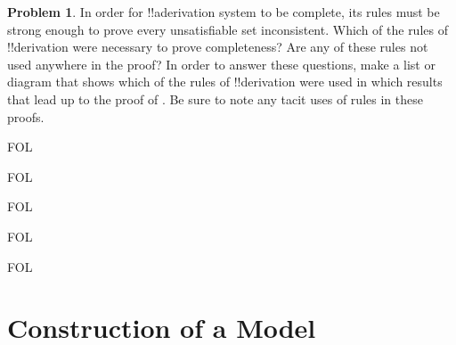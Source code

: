 \documentclass[10pt,a4paper]{article}
\makeatletter
\theoremstyle{plain}
\theoremstyle{definition}
\newtheorem{prob}{Problem}[section]
\theoremstyle{remark}
\newcommand*{\olfileid}[3]{}
\newcommand*{\olsection}[1]{\section*{#1}}
\newcommand*{\olchapter}[3]{}
\newcommand*{\olimport}[1]{}
\newcommand{\olref}{\@ifnextchar[{\olref@i}{\olref@final}}
\def\olref@i[#1]{\@ifnextchar[{\olref@ii}{\olref@final}}
\def\olref@ii[#1]{\@ifnextchar[{\olref@iii}{\olref@final}}
\def\olref@iii[#1]{\olref@final}
\def\olref@final#1{\ref{#1}}
\providecommand{\iftag}[1]{#1}
\makeatother
\begin{document}
\begin{prob}
In order for !!a{derivation} system to be complete, its rules must be
strong enough to prove every unsatisfiable set inconsistent.  Which of
the rules of !!{derivation} were necessary to prove completeness?  Are any
of these rules not used anywhere in the proof?  In order to answer
these questions, make a list or diagram that shows which of the rules
of !!{derivation} were used in which results that lead up to the proof of
\olref[pl][com][cth]{thm:completeness}.  Be sure to note any tacit
uses of rules in these proofs.
\end{prob}
\tagendprob





\iftag{FOL}
      {\olchapter{fol}{com}{The Completeness Theorem}}
      {\olchapter{pl}{com}{The Completeness Theorem}}

\olimport{introduction}

\olimport{outline}

\olimport{complete-consistent-sets}

\iftag{FOL}{%
  \olimport{henkin-expansions}
}{}

\olimport{lindenbaums-lemma}

\olimport{construction-of-model}

\iftag{FOL}{%
  \olimport{identity}
}{}

\olimport{completeness-thm}

\olimport{compactness}

\olimport{compactness-direct}

\iftag{FOL}{%
  \olimport{downward-ls}
}{}

\OLEndChapterHook





\iftag{FOL}
      {\olfileid{fol}{com}{mod}}
      {\olfileid{pl}{com}{mod}}

\olsection{Construction of a Model}
\end{document}
